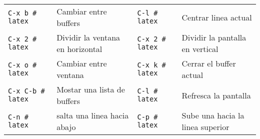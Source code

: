 \documentclass{article}
\begin{document}
\begin{longtable}{llll}
\texttt{C-x b   \# latex} & Cambiar entre buffers & \texttt{C-l       \# latex} & Centrar linea actual\\[0pt]
\texttt{C-x 2   \# latex} & Dividir la ventana en horizontal & \texttt{C-x 2     \# latex} & Dividir la pantalla en vertical\\[0pt]
\texttt{C-x o   \# latex} & Cambiar entre ventana & \texttt{C-x k     \# latex} & Cerrar el buffer actual\\[0pt]
\texttt{C-x C-b \# latex} & Mostar una lista de buffers & \texttt{C-l       \# latex} & Refresca la pantalla\\[0pt]
\texttt{C-n     \# latex} & salta una linea hacia abajo & \texttt{C-p       \# latex} & Sube una hacia la linea superior\\[0pt]
\end{longtable}
\end{document}
